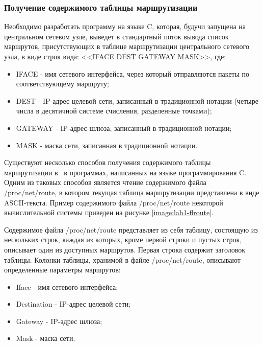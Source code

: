 \subsubsection{Получение содержимого таблицы маршрутизации}
	\label{lab1:lab1-p2}

	Необходимо разработать программу на языке C, которая, будучи запущена на центральном сетевом узле, выведет в стандартный поток вывода
	список маршрутов, присутствующих в таблице маршрутизации центрального сетевого узла, в виде строк вида: <<IFACE DEST GATEWAY MASK>>, где:

	\begin{itemize}

		\item IFACE - имя сетевого интерфейса, через который отправляются пакеты по соответствующему маршруту;
		\item DEST - IP-адрес целевой сети, записанный в традиционной нотации (четыре числа в десятичной системе счисления, разделенные точками);
		\item GATEWAY - IP-адрес шлюза, записанный в традиционной нотации;
		\item MASK - маска сети, записанная в традиционной нотации.

	\end{itemize}

	Существуют несколько способов получения содержимого таблицы маршрутизации в \linux\ в программах, написанных на языке программирования C.
	Одним из таковых способов является чтение содержимого файла /proc/net/route, в котором текущая таблица маршрутизации представлена в виде ASCII-текста.
	Пример содержимого файла \linebreak /proc/net/route некоторой вычислительной системы приведен на рисунке
	\ref{image:lab1-flroute}.


	Содержимое файла /proc/net/route представляет из себя таблицу, состоящую из нескольких строк,
	каждая из которых, кроме первой строки и пустых строк, описывает один из доступных маршрутов.
	Первая строка содержит заголовок таблицы. Колонки таблицы, хранимой в файле /proc/net/route,
	описывают определенные параметры маршрутов:

	\begin{itemize}
		
		\item Iface - имя сетевого интерфейса;
		\item Destination - IP-адрес целевой сети;
		\item Gateway - IP-адрес шлюза;
		\item Mask - маска сети.

	\end{itemize}


